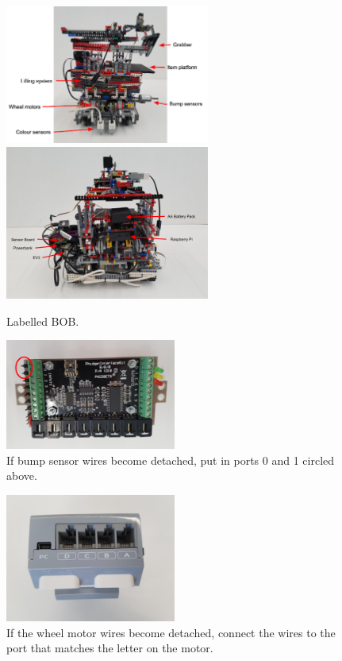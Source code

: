 \documentclass[onecolumn]{IEEEtran}
\begin{document}
\appendix
\begin{figure}[H]
    \begin{center}
    \includegraphics[width=0.6\textwidth]{bob_diagram.png}
    \includegraphics[width=0.6\textwidth]{bob_diagram2.png}
    \caption{Labelled BOB.}
    \label{fig: figure}
    \end{center}
\end{figure}
\begin{figure}[H]
    \begin{center}
    \includegraphics[width=0.5\textwidth]{bumper.png}
    \caption{If bump sensor wires become detached, put in ports 0 and 1 circled above.}
    \label{fig: figure}
    \end{center}
\end{figure}
\begin{figure}[H]
    \begin{center}
    \includegraphics[width=0.5\textwidth]{wheel.png}
    \caption{If the wheel motor wires become detached, connect the wires to the port that matches the letter on the motor.}
    \label{fig: figure}
    \end{center}
\end{figure}
\end{document}
